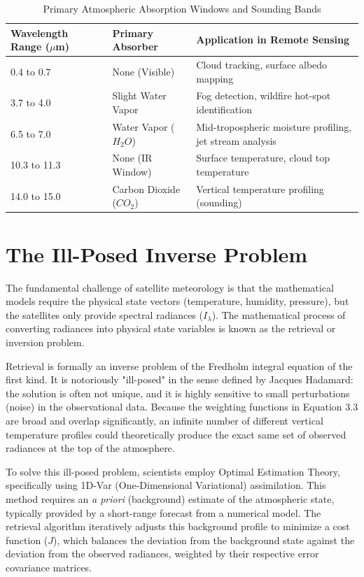 \begin{table}[H]
\centering
\caption{Primary Atmospheric Absorption Windows and Sounding Bands}
\begin{tabular}{|l|l|p{6cm}|}
\hline
\textbf{Wavelength Range ($\mu$m)} & \textbf{Primary Absorber} & \textbf{Application in Remote Sensing} \\ \hline
0.4 to 0.7 & None (Visible) & Cloud tracking, surface albedo mapping \\ \hline
3.7 to 4.0 & Slight Water Vapor & Fog detection, wildfire hot-spot identification \\ \hline
6.5 to 7.0 & Water Vapor ($H_2O$) & Mid-tropospheric moisture profiling, jet stream analysis \\ \hline
10.3 to 11.3 & None (IR Window) & Surface temperature, cloud top temperature \\ \hline
14.0 to 15.0 & Carbon Dioxide ($CO_2$) & Vertical temperature profiling (sounding) \\ \hline
\end{tabular}
\end{table}

\section{The Ill-Posed Inverse Problem}

The fundamental challenge of satellite meteorology is that the mathematical models require the physical state vectors (temperature, humidity, pressure), but the satellites only provide spectral radiances ($I_\lambda$). The mathematical process of converting radiances into physical state variables is known as the retrieval or inversion problem.

Retrieval is formally an inverse problem of the Fredholm integral equation of the first kind. It is notoriously "ill-posed" in the sense defined by Jacques Hadamard: the solution is often not unique, and it is highly sensitive to small perturbations (noise) in the observational data. Because the weighting functions in Equation 3.3 are broad and overlap significantly, an infinite number of different vertical temperature profiles could theoretically produce the exact same set of observed radiances at the top of the atmosphere.

To solve this ill-posed problem, scientists employ Optimal Estimation Theory, specifically using 1D-Var (One-Dimensional Variational) assimilation. This method requires an \textit{a priori} (background) estimate of the atmospheric state, typically provided by a short-range forecast from a numerical model. The retrieval algorithm iteratively adjusts this background profile to minimize a cost function ($J$), which balances the deviation from the background state against the deviation from the observed radiances, weighted by their respective error covariance matrices.

